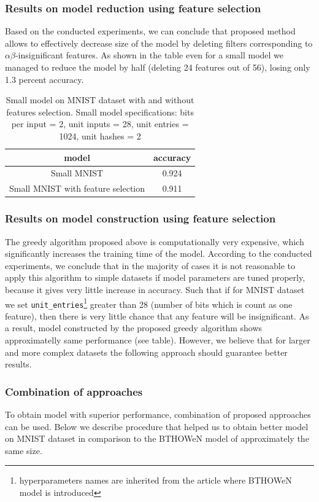 \documentclass{article}[12pt]
\begin{document}
\subsubsection{Results on model reduction using feature selection}
Based on the conducted experiments, we can conclude that proposed method allows to effectively decrease size of the model by deleting filters corresponding to $\alpha\beta$-insignificant features. As shown in the table even for a small model we managed to reduce the model by half (deleting 24 features out of 56), losing only 1.3 percent accuracy.
\begin{table}[h]
    \centering
    \begin{tabular}{|c|c|}
    \hline
    model & accuracy \\
    \hline
       Small MNIST &  0.924\\
    \hline
       Small MNIST with feature selection  & 0.911\\
    \hline
    \end{tabular}
    \caption{Small model on MNIST dataset with and without features selection. Small model specifications: bits per input = 2, unit inputs = 28, unit entries = 1024, unit hashes = 2}
    \label{table 2}
\end{table}

\subsubsection{Results on model construction using feature selection}
The greedy algorithm proposed above is computationally very expensive, which significantly increases the training time of the model. According to the conducted experiments, we conclude that in the majority of cases it is not reasonable to apply this algorithm to simple datasets if model parameters are tuned properly, because it gives very little increase in accuracy. Such that if for MNIST dataset we set \texttt{unit\_entries}\footnote{hyperparameters names are inherited from the article where BTHOWeN model is introduced} greater than 28 (number of bits which is count as one feature), then there is very little chance that any feature will be insignificant. As a result, model constructed by the proposed greedy algorithm shows approximatelly same performance (see table). However, we believe that for larger and more complex datasets the following approach should guarantee better results.


\subsubsection{Combination of approaches} \label{best res}
To obtain model with superior performance, combination of proposed approaches can be used. Below we describe procedure that helped us to obtain better model on MNIST dataset in comparison to the BTHOWeN model of approximately the same size.
\end{document}
